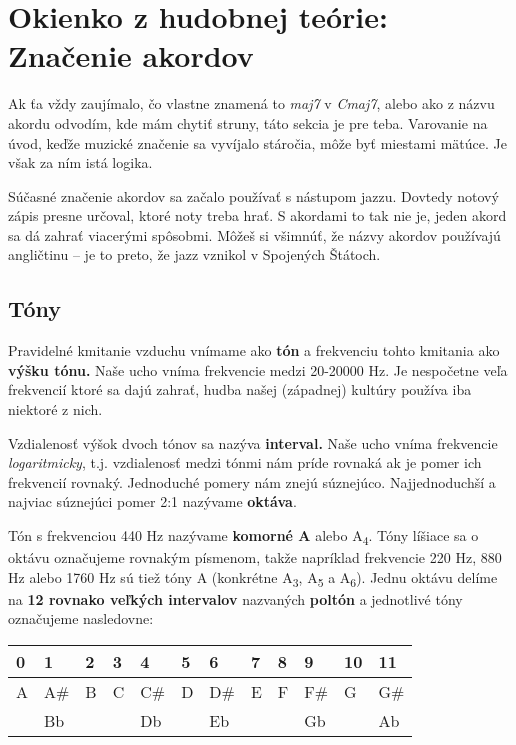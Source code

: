 \begingroup %
\setlength{\parindent}{0pt}
\setlength{\parskip}{\baselineskip}
\large
\def\arraystretch{1.5}%


\section*{Okienko z hudobnej teórie: Značenie akordov}

Ak ťa vždy zaujímalo, čo vlastne znamená to \emph{maj7} v \emph{Cmaj7}, alebo ako z názvu akordu
odvodím, kde mám chytiť struny, táto sekcia je pre teba. Varovanie na úvod, keďže muzické značenie
sa vyvíjalo stáročia, môže byť miestami mätúce. Je však za ním istá logika.

Súčasné značenie akordov sa začalo používať s nástupom jazzu. Dovtedy notový zápis presne určoval,
ktoré noty treba hrať. S akordami to tak nie je, jeden akord sa dá zahrať viacerými spôsobmi.
Môžeš si všimnúť, že názvy akordov používajú angličtinu -- je to preto, že jazz vznikol v Spojených Štátoch.


\subsection*{Tóny}

Pravidelné kmitanie vzduchu vnímame ako \textbf{tón} a frekvenciu tohto kmitania ako
\textbf{výšku tónu.} Naše ucho vníma frekvencie medzi 20-20000 Hz. Je nespočetne veľa
frekvencií ktoré sa dajú zahrať, hudba našej (západnej) kultúry používa iba niektoré
z nich.

Vzdialenosť výšok dvoch tónov sa nazýva \textbf{interval.} Naše ucho vníma frekvencie \textit{logaritmicky},
t.j. vzdialenosť medzi tónmi nám príde rovnaká ak je pomer ich frekvencií rovnaký. Jednoduché pomery nám
znejú súznejúco. Najjednoduchší a najviac súznejúci pomer 2:1 nazývame \textbf{oktáva}.

Tón s frekvenciou 440 Hz nazývame \textbf{komorné A} alebo A\textsubscript{4}. Tóny líšiace sa
o oktávu označujeme rovnakým písmenom, takže napríklad frekvencie 220 Hz, 880 Hz alebo 1760 Hz sú tiež tóny A
(konkrétne A\textsubscript{3}, A\textsubscript{5} a A\textsubscript{6}). Jednu oktávu delíme na
\textbf{12 rovnako veľkých intervalov} nazvaných \textbf{poltón} a jednotlivé tóny označujeme nasledovne:

\begin{center}
\begin{tabular}{ C{2em} C{2em} C{2em} C{2em} C{2em} C{2em} C{2em} C{2em} C{2em} C{2em} C{2em} C{2em} }
    0 & 1   & 2 & 3 & 4   & 5 & 6   & 7 & 8 & 9   & 10 & 11 \\
    \hline
    A & A\# & B & C & C\# & D & D\# & E & F & F\# & G & G\# \\
      & Bb  &   &   & Db  &   & Eb  &   &   & Gb  &   & Ab  \\
\end{tabular}
\end{center}

